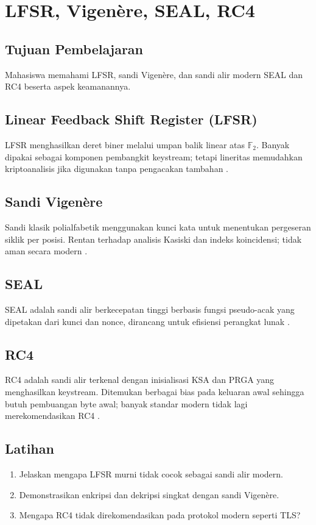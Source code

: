 \documentclass[../main.tex]{subfiles}
\begin{document}
\chapter{LFSR, Vigen\`{e}re, SEAL, RC4}

\section{Tujuan Pembelajaran}
Mahasiswa memahami LFSR, sandi Vigen\`{e}re, dan sandi alir modern SEAL dan RC4 beserta aspek keamanannya.

\section{Linear Feedback Shift Register (LFSR)}
LFSR menghasilkan deret biner melalui umpan balik linear atas \(\mathbb{F}_2\). Banyak dipakai sebagai komponen pembangkit keystream; tetapi lineritas memudahkan kriptoanalisis jika digunakan tanpa pengacakan tambahan \citep{menezes}.

\section{Sandi Vigen\`{e}re}
Sandi klasik polialfabetik menggunakan kunci kata untuk menentukan pergeseran siklik per posisi. Rentan terhadap analisis Kasiski dan indeks koincidensi; tidak aman secara modern \citep{stallings}.

\section{SEAL}
SEAL adalah sandi alir berkecepatan tinggi berbasis fungsi pseudo-acak yang dipetakan dari kunci dan nonce, dirancang untuk efisiensi perangkat lunak \citep{seal}.

\section{RC4}
RC4 adalah sandi alir terkenal dengan inisialisasi KSA dan PRGA yang menghasilkan keystream. Ditemukan berbagai bias pada keluaran awal sehingga butuh pembuangan byte awal; banyak standar modern tidak lagi merekomendasikan RC4 \citep{rc4,stallings}.

\section{Latihan}
\begin{enumerate}
  \item Jelaskan mengapa LFSR murni tidak cocok sebagai sandi alir modern.
  \item Demonstrasikan enkripsi dan dekripsi singkat dengan sandi Vigen\`{e}re.
  \item Mengapa RC4 tidak direkomendasikan pada protokol modern seperti TLS?
\end{enumerate}
\end{document}
